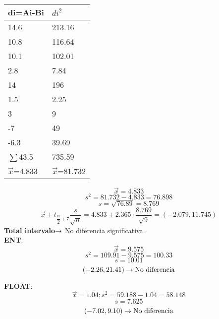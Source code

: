 \begin{tcolorbox}[colback=white,colframe=cyan!50!black,fonttitle=\bfseries]
\begin{table}[H]
\centering
\begin{tabular}{|l|l|}
\hline
\textbf{di=Ai-Bi} & \textbf{$di^2$} \\ \hline
14.6              & 213.16       \\ \hline
10.8              & 116.64       \\ \hline
10.1              & 102.01       \\ \hline
2.8               & 7.84         \\ \hline
14                & 196          \\ \hline
1.5               & 2.25         \\ \hline
3                 & 9            \\ \hline
-7                & 49           \\ \hline
-6.3              & 39.69        \\ \hline
$\sum$43.5              & 735.59       \\ \hline
$\Vec{x}$=4.833           & $\Vec{x}$=81.732     \\ \hline
\end{tabular}
\end{table}
\noindent
\[
\Vec{x}=4.833
\]
\[
s^2=81.732-4.833=76.898
\]
\[
s=\sqrt{76.89}=8.769
\]
\[
\Vec{x}\pm t_{\dfrac{\alpha}{2}+7}\dfrac{s}{\sqrt{n}}=4.833\pm 2.365\cdot\dfrac{8.769}{\sqrt{9}}=(-2.079,11.745)
\]
\textbf{Total intervalo}$\rightarrow$ No diferencia significativa.\\
\textbf{ENT}:
\[
\Vec{x}=9.575
\]
\[
s^2=109.91-9.575=100.33
\]
\[
s=10.01
\]
\[
(-2.26,21.41)\rightarrow\text{No diferencia}
\]
\end{tcolorbox}
\begin{tcolorbox}[colback=white,colframe=cyan!50!black,fonttitle=\bfseries]
\textbf{FLOAT}:
\[
\Vec{x}=1.04; s^2=59.188-1.04=58.148
\]
\[
s=7.625
\]
\[
(-7.02,9.10)\rightarrow\text{No diferencia}
\]
\end{tcolorbox} 
